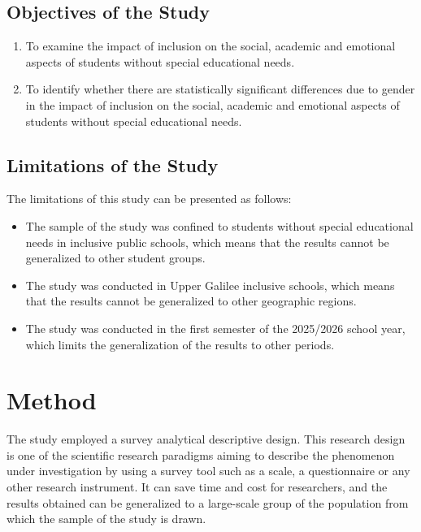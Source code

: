 \documentclass[10pt]{NSP1}
\begin{document}
	\subsection{Objectives of the Study}

	\begin{enumerate}
		\item To examine the impact of inclusion on the social, academic and emotional aspects of students without special educational needs.
		\item To identify whether there are statistically significant differences due to gender in the impact of inclusion on the social, academic and emotional aspects of students without special educational needs.
	\end{enumerate}

	\subsection{Limitations of the Study}

	The limitations of this study can be presented as follows:

	\begin{itemize}
		\item The sample of the study was confined to students without special educational needs in inclusive public schools, which means that the results cannot be generalized to other student groups.
		\item The study was conducted in Upper Galilee inclusive schools, which means that the results cannot be generalized to other geographic regions.
		\item The study was conducted in the first semester of the 2025/2026 school year, which limits the generalization of the results to other periods.
	\end{itemize}

	\section{Method}

	The study employed a survey analytical descriptive design. This research design is one of the scientific research paradigms aiming to describe the phenomenon under investigation by using a survey tool such as a scale, a questionnaire or any other research instrument. It can save time and cost for researchers, and the results obtained can be generalized to a large-scale group of the population from which the sample of the study is drawn.
\end{document}
